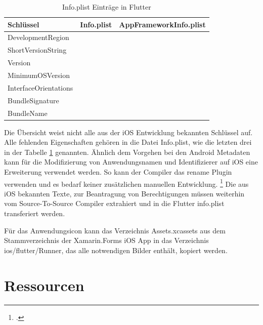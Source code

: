 \begin{table}[!ht]
  \begin{tabularx}{\linewidth}{|l|X|X|}
  \hline

  \textbf{Schlüssel}  &  \textbf{Info.plist} & \textbf{AppFrameworkInfo.plist} \\
\hline
  DevelopmentRegion  		&  					& 		\checkmark	 \\
  ShortVersionString  		&  					& 		\checkmark	 \\
  Version  							&  					& 		\checkmark	 \\
  MinimumOSVersion  		&  					& 		\checkmark	 \\
  
  InterfaceOrientations  		& \checkmark  	&		 					\\
  BundleSignature  			&  \checkmark 	& 							\\
  BundleName  					&  \checkmark 	& 		 					\\
  \hline
\end{tabularx}
\caption{Info.plist Einträge in Flutter}
 \label{tab:InfoPlist}
\end{table}
Die Übersicht weist nicht alle aus der iOS Entwicklung bekannten Schlüssel auf.  Alle fehlenden Eigenschaften gehören in die Datei \glq Info.plist\grq, wie die letzten drei in der Tabelle \ref{tab:InfoPlist} genannten.  Ähnlich dem Vorgehen bei den Android Metadaten kann für die Modifizierung  von Anwendungsnamen und Identifizierer auf iOS eine Erweiterung verwendet werden.  So kann der Compiler das \glq rename\grq{} Plugin verwenden und es bedarf keiner zusätzlichen manuellen Entwicklung. \footcite[Vgl.][Abgerufen am \today]{Rename}  Die aus iOS bekannten Texte,  zur Beantragung von Berechtigungen müssen weiterhin vom Source-To-Source Compiler extrahiert und in die Flutter \glq info.plist\grq{} transferiert werden.

Für das Anwendungsicon kann das Verzeichnis \glq Assets.xcassets\grq{} aus dem Stammverzeichnis der Xamarin.Forms iOS App in das Verzeichnis \glq ios/flutter/Runner\grq , das alle notwendigen Bilder enthält,  kopiert werden. 

\section{Ressourcen}

